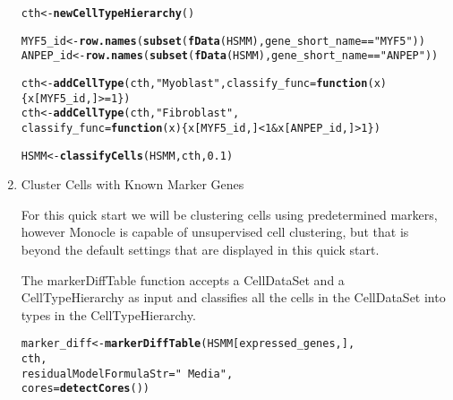 \documentclass[10pt,oneside]{article}\usepackage[]{graphicx}\usepackage[]{color}
\makeatletter
\newcommand{\hlnum}[1]{\textcolor[rgb]{0.686,0.059,0.569}{#1}}%
\newcommand{\hlstr}[1]{\textcolor[rgb]{0.192,0.494,0.8}{#1}}%
\newcommand{\hlopt}[1]{\textcolor[rgb]{0,0,0}{#1}}%
\newcommand{\hlstd}[1]{\textcolor[rgb]{0.345,0.345,0.345}{#1}}%
\newcommand{\hlkwa}[1]{\textcolor[rgb]{0.161,0.373,0.58}{\textbf{#1}}}%
\newcommand{\hlkwb}[1]{\textcolor[rgb]{0.69,0.353,0.396}{#1}}%
\newcommand{\hlkwc}[1]{\textcolor[rgb]{0.333,0.667,0.333}{#1}}%
\newcommand{\hlkwd}[1]{\textcolor[rgb]{0.737,0.353,0.396}{\textbf{#1}}}%
\newenvironment{kframe}{%
 \def\at@end@of@kframe{}%
 \ifinner\ifhmode%
  \def\at@end@of@kframe{\end{minipage}}%
  \begin{minipage}{\columnwidth}%
 \fi\fi%
 \def\FrameCommand##1{\hskip\@totalleftmargin \hskip-\fboxsep
 \colorbox{shadecolor}{##1}\hskip-\fboxsep
     \hskip-\linewidth \hskip-\@totalleftmargin \hskip\columnwidth}%
 \MakeFramed {\advance\hsize-\width
   \@totalleftmargin\z@ \linewidth\hsize
   \@setminipage}}%
 {\par\unskip\endMakeFramed%
 \at@end@of@kframe}
\newenvironment{knitrout}{}{} %
\makeatother
\begin{document}
\begin{enumerate}
\begin{knitrout}
\color{fgcolor}\begin{kframe}
\begin{alltt}
\hlstd{cth} \hlkwb{<-} \hlkwd{newCellTypeHierarchy}\hlstd{()}

\hlstd{MYF5_id} \hlkwb{<-} \hlkwd{row.names}\hlstd{(}\hlkwd{subset}\hlstd{(}\hlkwd{fData}\hlstd{(HSMM), gene_short_name} \hlopt{==} \hlstr{"MYF5"}\hlstd{))}
\hlstd{ANPEP_id} \hlkwb{<-} \hlkwd{row.names}\hlstd{(}\hlkwd{subset}\hlstd{(}\hlkwd{fData}\hlstd{(HSMM), gene_short_name} \hlopt{==} \hlstr{"ANPEP"}\hlstd{))}

\hlstd{cth} \hlkwb{<-} \hlkwd{addCellType}\hlstd{(cth,} \hlstr{"Myoblast"}\hlstd{,} \hlkwc{classify_func} \hlstd{=} \hlkwa{function}\hlstd{(}\hlkwc{x}\hlstd{) \{x[MYF5_id,]} \hlopt{>=} \hlnum{1}\hlstd{\})}
\hlstd{cth} \hlkwb{<-} \hlkwd{addCellType}\hlstd{(cth,} \hlstr{"Fibroblast"}\hlstd{,}
                   \hlkwc{classify_func} \hlstd{=} \hlkwa{function}\hlstd{(}\hlkwc{x}\hlstd{) \{x[MYF5_id,]} \hlopt{<} \hlnum{1} \hlopt{&} \hlstd{x[ANPEP_id,]} \hlopt{>} \hlnum{1}\hlstd{\} )}

\hlstd{HSMM} \hlkwb{<-} \hlkwd{classifyCells}\hlstd{(HSMM, cth,} \hlnum{0.1}\hlstd{)}
\end{alltt}
\end{kframe}
\end{knitrout}
 
 \item Cluster Cells with Known Marker Genes
 
 For this quick start we will be clustering cells using predetermined markers, however Monocle is capable of unsupervised cell clustering, but that is beyond the default settings that are displayed in this quick start.
 
 The markerDiffTable function accepts a CellDataSet and a CellTypeHierarchy as input and classifies all the cells in the CellDataSet into types in the CellTypeHierarchy.
\begin{knitrout}
\color{fgcolor}\begin{kframe}
\begin{alltt}
\hlstd{marker_diff} \hlkwb{<-} \hlkwd{markerDiffTable}\hlstd{(HSMM[expressed_genes,],}
                               \hlstd{cth,}
                               \hlkwc{residualModelFormulaStr} \hlstd{=} \hlstr{"~Media"}\hlstd{,}
                               \hlkwc{cores} \hlstd{=} \hlkwd{detectCores}\hlstd{())}
\end{alltt}
\end{kframe}
\end{knitrout}
 

\end{enumerate}
\end{document}
